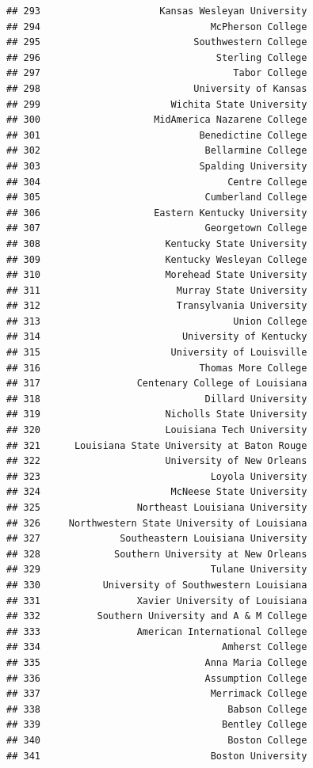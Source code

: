 \documentclass[]{article}
\begin{document}
\begin{verbatim}
## 293                     Kansas Wesleyan University
## 294                              McPherson College
## 295                           Southwestern College
## 296                               Sterling College
## 297                                  Tabor College
## 298                           University of Kansas
## 299                       Wichita State University
## 300                    MidAmerica Nazarene College
## 301                            Benedictine College
## 302                             Bellarmine College
## 303                            Spalding University
## 304                                 Centre College
## 305                             Cumberland College
## 306                    Eastern Kentucky University
## 307                             Georgetown College
## 308                      Kentucky State University
## 309                      Kentucky Wesleyan College
## 310                      Morehead State University
## 311                        Murray State University
## 312                        Transylvania University
## 313                                  Union College
## 314                         University of Kentucky
## 315                       University of Louisville
## 316                            Thomas More College
## 317                 Centenary College of Louisiana
## 318                             Dillard University
## 319                      Nicholls State University
## 320                      Louisiana Tech University
## 321      Louisiana State University at Baton Rouge
## 322                      University of New Orleans
## 323                              Loyola University
## 324                       McNeese State University
## 325                 Northeast Louisiana University
## 326     Northwestern State University of Louisiana
## 327              Southeastern Louisiana University
## 328             Southern University at New Orleans
## 329                              Tulane University
## 330           University of Southwestern Louisiana
## 331                 Xavier University of Louisiana
## 332          Southern University and A & M College
## 333                 American International College
## 334                                Amherst College
## 335                             Anna Maria College
## 336                             Assumption College
## 337                              Merrimack College
## 338                                 Babson College
## 339                                Bentley College
## 340                                 Boston College
## 341                              Boston University

\end{verbatim}
\end{document}

